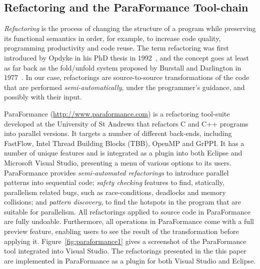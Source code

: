 \subsection{Refactoring and the ParaFormance Tool-chain}

\noindent
\emph{Refactoring} is the process of changing the structure of a program while preserving
its functional semantics in order, for example, to increase code quality, programming
productivity and code reuse. The term refactoring was first introduced by Opdyke in his PhD thesis in 1992~\cite{opdyke}, and the concept goes at least as far back as the fold/unfold system proposed by Burstall and Darlington in 1977~\cite{darlington77}. In our case, refactorings are source-to-source transformations of the code that are performed \emph{semi-automatically}, under the programmer's guidance, and possibly with their input. 

%
%
%

ParaFormance (\url{http://www.paraformance.com}) is a refactoring tool-suite developed at the University of St Andrews that refactors C and C++ programs into parallel versions. It targets a number of different back-ends, including FastFlow, Intel Thread Building Blocks (TBB), OpenMP and GrPPI. It has a number of unique features and is integrated as a plugin into both Eclipse and Microsoft Visual Studio, presenting a menu of various options to its users. ParaFormance provides \emph{semi-automated refactorings} to introduce parallel patterns into sequential code; \emph{safety checking} features to find, statically, parallelism related bugs, such as race-conditions, deadlocks and memory collisions; and \emph{pattern discovery}, to find the hotspots in the program that are suitable for parallelism. All refactorings applied to source code in ParaFormance are fully undoable. Furthermore, all operations in ParaFormance come with a full preview feature, enabling users to see the result of the transformation before applying it. Figure~\ref{fig:paraformance1} gives a screenshot of the ParaFormance tool integrated into Visual Studio. The refactorings presented in the this paper are implemented in ParaFormance as a plugin for both Visual Studio and Eclipse.

